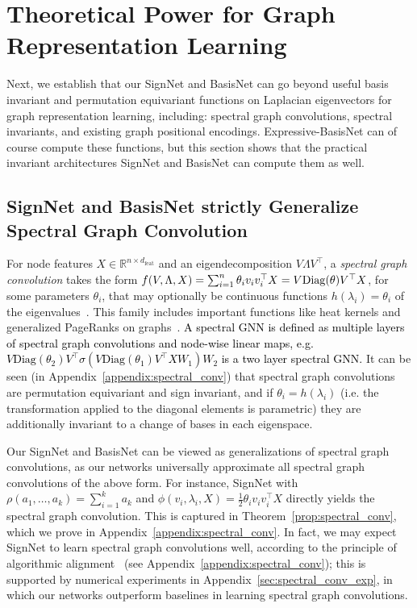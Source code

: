 \documentclass{article} \usepackage{iclr2023_conference,times}
\newcommand{\RR}{\mathbb R}
\newcommand{\mrm}[1]{\mathrm{#1}}
\newcommand{\dfeat}{d_{\mrm{feat}}}
\newcommand{\rebut}[1]{\textcolor{black}{#1}}
\begin{document}
\section{Theoretical Power for Graph Representation Learning}

Next, we establish that our SignNet and BasisNet can go beyond useful basis invariant and permutation equivariant functions on Laplacian eigenvectors for graph representation learning, including: spectral graph convolutions, spectral invariants, and existing graph positional encodings.  Expressive-BasisNet can of course compute these functions,  but this section shows that the practical invariant architectures SignNet and BasisNet can compute them as well.

\subsection{SignNet and BasisNet strictly Generalize Spectral Graph Convolution}\label{sec:spectral_conv}

For node features $X \in \RR^{n \times \dfeat}$ and an eigendecomposition $V\Lambda V^\top$, a \emph{spectral graph convolution} takes the form $f(V, \Lambda, X) = \sum_{i=1}^n \theta_i v_i v_i^\top X = \rebut{V\mrm{Diag}(\theta)V^\top X}$, for some parameters $\theta_i$, that may optionally be continuous functions $h(\lambda_i) = \theta_i$ of the eigenvalues~\citep{bruna2014spectral,defferrard2016convolutional}. This family includes important functions like heat kernels and generalized PageRanks on graphs~\citep{li2019optimizing}. \rebut{A spectral GNN is defined as multiple layers of spectral graph convolutions and node-wise linear maps, e.g. $V\mrm{Diag}(\theta_2)V^\top \sigma\left(V\mrm{Diag}(\theta_1)V^\top XW_1 \right) W_2$ is a two layer spectral GNN.}
It can be seen (in Appendix~\ref{appendix:spectral_conv}) that spectral graph convolutions are permutation equivariant and sign invariant, and if $\theta_i = h(\lambda_i)$ (i.e. the transformation applied to the diagonal elements is parametric) they are additionally invariant to a change of bases in each eigenspace. 

Our SignNet and BasisNet can be viewed as generalizations of spectral graph convolutions, as our networks universally approximate all spectral graph convolutions of the above form. For instance, SignNet with $\rho(a_1, \ldots, a_k) = \sum_{i=1}^k a_k$ and $\phi(v_i, \lambda_i, X) = \frac{1}{2}\theta_i v_i v_i^\top X$ directly yields the spectral graph convolution. This is captured in  Theorem~\ref{prop:spectral_conv}, which we prove in Appendix~\ref{appendix:spectral_conv}. In fact, we may expect SignNet to learn spectral graph convolutions well, according to the principle of algorithmic alignment~\citep{xu2019can} (see Appendix~\ref{appendix:spectral_conv}); this is supported by numerical experiments in Appendix~\ref{sec:spectral_conv_exp}, in which our networks outperform baselines in learning spectral graph convolutions.
\end{document}
